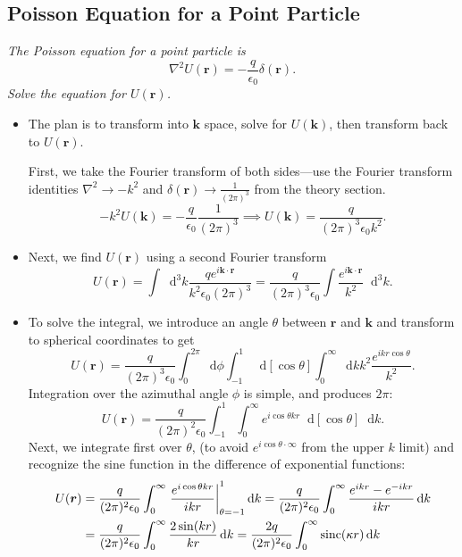 \documentclass[11pt, a4paper]{article}
\newcommand{\diff}{\mathop{}\!\mathrm{d}} %
\renewcommand{\vec}[1]{\bm{#1}} %
\renewcommand{\r}{\vec{r}}
\newcommand{\ee}{\epsilon_{0}}  %
\begin{document}
\subsection{Poisson Equation for a Point Particle}
\textit{The Poisson equation for a point particle is}
\begin{equation*}
	\nabla^{2}U(\r) = - \frac{q}{\ee} \delta (\r).
\end{equation*}
\textit{Solve the equation for $ U(\r) $.}
\begin{itemize}
	
	\item The plan is to transform into $ \vec{k} $ space, solve for $ U(\vec{k}) $, then transform back to $ U(\r) $. 
	
	First, we take the Fourier transform of both sides---use the Fourier transform identities $ \nabla^{2} \to -k^{2} $ and $ \delta(\r) \to \frac{1}{(2\pi)^{3}} $ from the theory section.
	\begin{equation*}
		- k^{2}U(\vec{k}) = - \frac{q}{\ee} \frac{1}{(2\pi)^{3}} \implies U(\vec{k}) = \frac{q}{(2\pi)^{3} \ee k^{2}}.
	\end{equation*}
	
	\item Next, we find $ U(\r) $ using a second Fourier transform
	\begin{equation*}
		U(\r) = \int \diff^{3} k \frac{q e^{i\vec{k}\cdot \r}}{k^{2}\ee(2\pi)^{3}} = \frac{q}{(2\pi)^{3}\ee} \int \frac{e^{i\vec{k}\cdot \r}}{k^{2}} \diff^{3}k.
    \end{equation*}
	
    \item To solve the integral, we introduce an angle $ \theta $ between $ \r $ and $ \vec{k} $ and transform to spherical coordinates to get
	\begin{equation*}
		U(\r) =  \frac{q}{(2\pi)^{3}\ee} \int_{0}^{2\pi}\diff \phi \int_{-1}^{1} \diff [\cos \theta] \int_{0}^{\infty} \diff k k^{2} \frac{e^{ik r\cos \theta}}{k^{2}}.
	\end{equation*}
	Integration over the azimuthal angle $ \phi $ is simple, and produces $ 2\pi $:
	\begin{equation*}
		U(\r) = \frac{q}{(2\pi)^{2}\ee} \int_{-1}^{1}\int_{0}^{\infty} e^{i \cos \theta k r} \diff[\cos \theta] \diff k. 
	\end{equation*}
	Next, we integrate first over $ \theta $, (to avoid $ e^{i \cos \theta \cdot \infty} $ from the upper $ k $ limit) and recognize the sine function in the difference of exponential functions:
	\begin{align*}
        U(\r) &= \frac{q}{(2\pi)^{2}\ee} \int_{0}^{\infty} \eval{\frac{e^{i \cos \theta k r}}{i k r}}_{\theta = -1}^{1} \diff k = \frac{q}{(2\pi)^{2}\ee} \int_{0}^{\infty}\frac{e^{ikr}-e^{-ikr}}{ikr} \diff k \\
        & = \frac{q}{(2\pi)^{2}\ee} \int_{0}^{\infty}\frac{2\sin (kr)}{kr} \diff k = \frac{2q}{(2\pi)^{2}\ee} \int_{0}^{\infty} \operatorname{sinc}(\kappa r) \diff k
	\end{align*}


\end{itemize}
\end{document}
